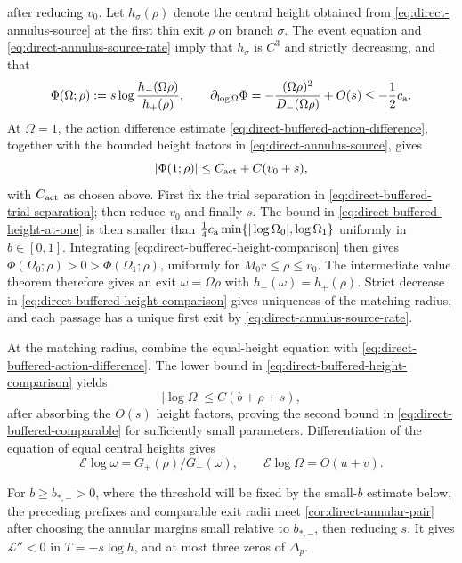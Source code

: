 after reducing \(v_0\).  Let \(h_\sigma(\rho)\) denote the central height
obtained from \eqref{eq:direct-annulus-source} at the first thin exit
\(\rho\) on branch \(\sigma\).  The event equation and
\eqref{eq:direct-annulus-source-rate} imply that \(h_\sigma\) is \(C^3\)
and strictly decreasing, and that
\begin{equation}
\label{eq:direct-buffered-height-comparison}
 \Phi(\Omega;\rho):=s\log\frac{h_-(\Omega\rho)}{h_+(\rho)},\qquad
 \partial_{\log\Omega}\Phi
 =-\frac{(\Omega\rho)^2}{D_-(\Omega\rho)}+O(s)\le-\frac12c_{\rm a}.
\end{equation}
At \(\Omega=1\), the action difference estimate
\eqref{eq:direct-buffered-action-difference}, together with the bounded
height factors in \eqref{eq:direct-annulus-source}, gives
\begin{equation}
\label{eq:direct-buffered-height-at-one}
 |\Phi(1;\rho)|\le C_{\rm act}+C(v_0+s),
\end{equation}
with \(C_{\rm act}\) as chosen above. First fix the trial separation in
\eqref{eq:direct-buffered-trial-separation}; then reduce \(v_0\) and
finally \(s\).  The bound in
\eqref{eq:direct-buffered-height-at-one} is then smaller than
\(\frac14c_{\rm a}\min\{|\log\Omega_0|,\log\Omega_1\}\) uniformly in
\(b\in[0,1]\).  Integrating
\eqref{eq:direct-buffered-height-comparison} then gives
\(\Phi(\Omega_0;\rho)>0>\Phi(\Omega_1;\rho)\), uniformly for
\(M_0r\le\rho\le v_0\). The intermediate value theorem therefore gives an exit
\(\omega=\Omega\rho\) with \(h_-(\omega)=h_+(\rho)\).  Strict decrease in
\eqref{eq:direct-buffered-height-comparison} gives uniqueness of the
matching radius, and each passage has a unique first exit by
\eqref{eq:direct-annulus-source-rate}.

At the matching radius, combine the equal-height equation with
\eqref{eq:direct-buffered-action-difference}. The lower bound
in \eqref{eq:direct-buffered-height-comparison} yields
\begin{equation}
\label{eq:direct-buffered-log-omega-bound}
 |\log\Omega|\le C(b+\rho+s),
\end{equation}
after absorbing the \(O(s)\) height factors, proving the second bound in
\eqref{eq:direct-buffered-comparable} for sufficiently small parameters.
Differentiation of the equation of equal central heights gives
\[
 \mathcal E\log\omega=G_+(\rho)/G_-(\omega),\qquad
 \mathcal E\log\Omega=O(u+v).
\]

For \(b\ge b_{*,-}>0\), where the threshold will be fixed by the
small-\(b\) estimate below, the preceding prefixes and comparable exit
radii meet \cref{cor:direct-annular-pair} after choosing the annular
margins small relative to \(b_{*,-}\), then reducing \(s\). It gives
\(\mathcal L''<0\) in \(T=-s\log h\), and at most three zeros of \(\Delta_p\).


